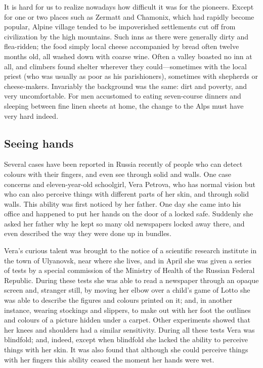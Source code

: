 \documentclass[11pt]{article}
\begin{document}
It is hard for us to realize nowadays how difficult it was for the pioneers. Except for one or two places such as Zermatt and Chamonix, which had rapidly become popular, Alpine village tended to be impoverished settlements cut off from civilization by the high mountains. Such inns as there were generally dirty and flea-ridden; the food simply local cheese accompanied by bread often twelve months old, all washed down with coarse wine. Often a valley boasted no inn at all, and climbers found shelter wherever they could---sometimes with the local priest (who was usually as poor as his parishioners), sometimes with shepherds or cheese-makers. Invariably the background was the same: dirt and poverty, and very uncomfortable. For men accustomed to eating seven-course dinners and sleeping between fine linen sheets at home, the change to the Alps must have very hard indeed.
\subsection{Seeing hands}
\label{sec-2-4}

Several cases have been reported in Russia recently of people who can detect colours with their fingers, and even see through solid and walls. One case concerns and eleven-year-old schoolgirl, Vera Petrova, who has normal vision but who can also perceive things with different parts of her skin, and through solid walls. This ability was first noticed by her father. One day she came into his office and happened to put her hands on the door of a locked safe. Suddenly she asked her father why he kept so many old newspapers locked away there, and even described the way they were done up in bundles.

Vera's curious talent was brought to the notice of a scientific research institute in the town of Ulyanovsk, near where she lives, and in April she was given a series of tests by a special commission of the Ministry of Health of the Russian Federal Republic. During these tests she was able to read a newspaper through an opaque screen and, stranger still, by moving her elbow over a child's game of Lotto she was able to describe the figures and colours printed on it; and, in another instance, wearing stockings and slippers, to make out with her foot the outlines and colours of a picture hidden under a carpet. Other experiments showed that her knees and shoulders had a similar sensitivity. During all these tests Vera was blindfold; and, indeed, except when blindfold she lacked the ability to perceive things with her skin. It was also found that although she could perceive things with her fingers this ability ceased the moment her hands were wet.
\end{document}
